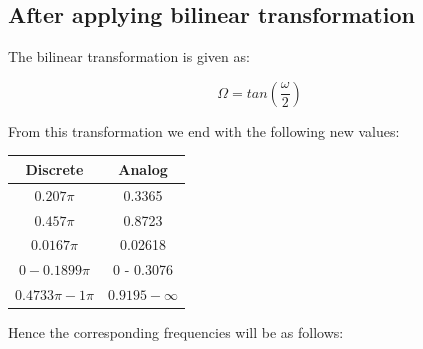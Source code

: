 \documentclass[12pt, letterpaper,]{article}
\begin{document}
 \subsection{After applying bilinear transformation}

 The bilinear transformation is given as:

 \begin{equation}
     \Omega = tan(\frac{\omega}{2})
 \end{equation}

 \newpage

 From this transformation we end with the following new values:
\begin{table}[!h]
    \centering

\begin{tabular}{|c|c|}
\hline
Discrete & Analog \\
\hline
$0.207\pi$ & 0.3365 \\
$0.457\pi$ & 0.8723 \\
$0.0167\pi$ & 0.02618 \\
$0 - 0.1899\pi$ & 0 - 0.3076\\
$0.4733\pi - 1\pi$ & $0.9195 - \infty$ \\

\hline
\end{tabular}

\end{table}

Hence the corresponding frequencies will be as follows:
\end{document}
